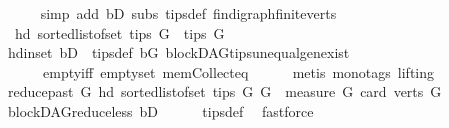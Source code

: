 \begin{isabellebody}
\ \ \ \ \isamarkupfalse%
\ {\isacharparenleft}{\kern0pt}simp\ add{\isacharcolon}{\kern0pt}\ bD\ subs\ tips{\isacharunderscore}{\kern0pt}def\ fin{\isacharunderscore}{\kern0pt}digraph{\isachardot}{\kern0pt}finite{\isacharunderscore}{\kern0pt}verts{\isacharparenright}{\kern0pt}\isanewline
\ \ \isamarkupfalse%
\ \isamarkupfalse%
\ {\isachardoublequoteopen}\ hd\ {\isacharparenleft}{\kern0pt}sorted{\isacharunderscore}{\kern0pt}list{\isacharunderscore}{\kern0pt}of{\isacharunderscore}{\kern0pt}set\ {\isacharparenleft}{\kern0pt}tips\ G{\isacharparenright}{\kern0pt}{\isacharparenright}{\kern0pt}\ {\isasymin}\ tips\ G{\isachardoublequoteclose}\ \ \isanewline
\ \ \ \ \isamarkupfalse%
\ hd{\isacharunderscore}{\kern0pt}in{\isacharunderscore}{\kern0pt}set\ bD\ \ tips{\isacharunderscore}{\kern0pt}def\ bG\ blockDAG{\isachardot}{\kern0pt}tips{\isacharunderscore}{\kern0pt}unequal{\isacharunderscore}{\kern0pt}gen{\isacharunderscore}{\kern0pt}exist\ \isanewline
\ \ \ \ \ \ empty{\isacharunderscore}{\kern0pt}iff\ empty{\isacharunderscore}{\kern0pt}set\ mem{\isacharunderscore}{\kern0pt}Collect{\isacharunderscore}{\kern0pt}eq\isanewline
\ \ \ \ \isamarkupfalse%
\ {\isacharparenleft}{\kern0pt}metis\ {\isacharparenleft}{\kern0pt}mono{\isacharunderscore}{\kern0pt}tags{\isacharcomma}{\kern0pt}\ lifting{\isacharparenright}{\kern0pt}{\isacharparenright}{\kern0pt}\ \ \isanewline
\ \ \isamarkupfalse%
\ \isamarkupfalse%
\ {\isachardoublequoteopen}{\isacharparenleft}{\kern0pt}reduce{\isacharunderscore}{\kern0pt}past\ G\ {\isacharparenleft}{\kern0pt}hd\ {\isacharparenleft}{\kern0pt}sorted{\isacharunderscore}{\kern0pt}list{\isacharunderscore}{\kern0pt}of{\isacharunderscore}{\kern0pt}set\ {\isacharparenleft}{\kern0pt}tips\ G{\isacharparenright}{\kern0pt}{\isacharparenright}{\kern0pt}{\isacharparenright}{\kern0pt}{\isacharcomma}{\kern0pt}\ G{\isacharparenright}{\kern0pt}\ {\isasymin}\ measure\ {\isacharparenleft}{\kern0pt}{\isasymlambda}G{\isachardot}{\kern0pt}\ card\ {\isacharparenleft}{\kern0pt}verts\ G{\isacharparenright}{\kern0pt}{\isacharparenright}{\kern0pt}{\isachardoublequoteclose}\isanewline
\ \ \ \ \isamarkupfalse%
\ blockDAG{\isachardot}{\kern0pt}reduce{\isacharunderscore}{\kern0pt}less\ bD\isanewline
\ \ \ \ \isamarkupfalse%
\ tips{\isacharunderscore}{\kern0pt}def\ \isamarkupfalse%
\ fastforce\ \isanewline
{}\isamarkupfalse%
%
\endisatagproof
{\isafoldproof}%
%
\isadelimproof
%
\endisadelimproof
\isanewline

\end{isabellebody}
